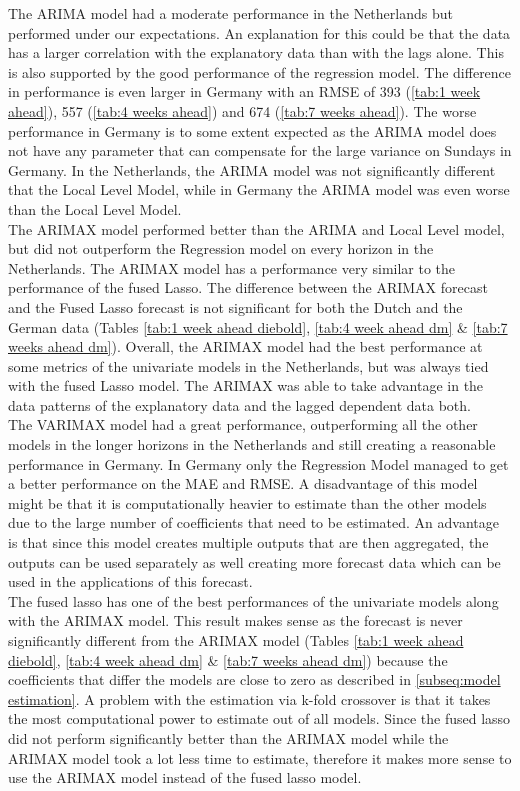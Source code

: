 The ARIMA model had a moderate performance in the Netherlands but performed under our expectations. An explanation for this could be that the data has a larger correlation with the explanatory data than with the lags alone. This is also supported by the good performance of the regression model. The difference in performance is even larger in Germany with an RMSE of 393 (\autoref{tab:1 week ahead}), 557 (\autoref{tab:4 weeks ahead}) and 674 (\autoref{tab:7 weeks ahead}). The worse performance in Germany is to some extent expected as the ARIMA model does not have any parameter that can compensate for the large variance on Sundays in Germany. In the Netherlands, the ARIMA model was not significantly different that the Local Level Model, while in Germany the ARIMA model was even worse than the Local Level Model.\\

The ARIMAX model performed better than the ARIMA and Local Level model, but did not outperform the Regression model on every horizon in the Netherlands. The ARIMAX model has a performance very similar to the performance of the fused Lasso. The difference between the ARIMAX forecast and the Fused Lasso forecast is not significant for both the Dutch and the German data (Tables \ref{tab:1 week ahead diebold}, \ref{tab:4 week ahead dm} \& \ref{tab:7 weeks ahead dm}). Overall, the ARIMAX model had the best performance at some metrics of the univariate models in the Netherlands, but was always tied with the fused Lasso model. The ARIMAX was able to take advantage in the data patterns of the explanatory data and the lagged dependent data both.\\

The VARIMAX model had a great performance, outperforming all the other models in the longer horizons in the Netherlands and still creating a reasonable performance in Germany. In Germany only the Regression Model managed to get a better performance on the MAE and RMSE. A disadvantage of this model might be that it is computationally heavier to estimate than the other models due to the large number of coefficients that need to be estimated. An advantage is that since this model creates multiple outputs that are then aggregated, the outputs can be used separately as well creating more forecast data which can be used in the applications of this forecast.\\

The fused lasso has one of the best performances of the univariate models along with the ARIMAX model. This result makes sense as the forecast is never significantly different from the ARIMAX model (Tables \ref{tab:1 week ahead diebold}, \ref{tab:4 week ahead dm} \& \ref{tab:7 weeks ahead dm}) because the coefficients that differ the models are close to zero as described in \autoref{subseq:model estimation}. A problem with the estimation via k-fold crossover is that it takes the most computational power to estimate out of all models. Since the fused lasso did not perform significantly better than the ARIMAX model while the ARIMAX model took a lot less time to estimate, therefore it makes more sense to use the ARIMAX model instead of the fused lasso model.\\

